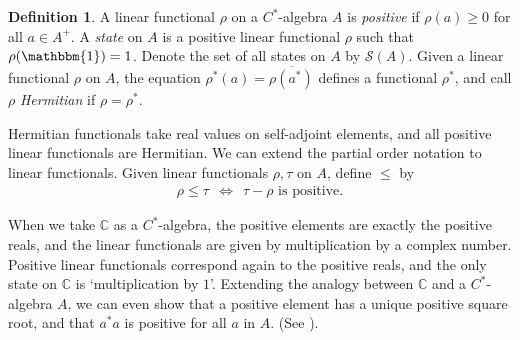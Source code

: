 \documentclass[11pt,a4paper]{report}
\theoremstyle{plain}
\theoremstyle{definition}
\newtheorem{defn}{Definition}
\newcommand{\1}{\mathbbm{1}}
\newcommand{\C}{\mathbb{C}}
\renewcommand{\S}{\mathscr{S}}
\renewcommand{\bar}{\overline}
\begin{document}
\begin{defn}
	A linear functional $\rho$ on a $C^\ast$-algebra $A$ is \emph{positive} if $\rho(a)\geq 0$ for all 
	$a\in A^+$. A \emph{state} on $A$ is a positive linear functional $\rho$ such that $\rho(\1)=1$. 
	Denote the set of all states on $A$ by $\S(A)$. 
	Given a linear functional $\rho$ on $A$, the equation $\rho^\ast(a) =\bar{\rho(a^\ast)}$ defines a 
	functional $\rho^\ast$, and call $\rho$ \emph{Hermitian} if $\rho=\rho^\ast$.
\end{defn}
Hermitian functionals take real values on self-adjoint elements, and all positive linear functionals are 
Hermitian.
We can extend the partial order notation to linear functionals. Given linear functionals $\rho,\tau$ on 
$A$, define $\leq$ by
\begin{align*}
	\rho \leq \tau ~~\iff~~ \tau - \rho \mbox{ is positive}.
\end{align*}

When we take $\C$ as a $C^\ast$-algebra, the positive elements are exactly the 
positive reals, and the linear functionals are given by multiplication by a 
complex number. Positive linear functionals correspond again to the positive 
reals, and the only state on $\C$ is `multiplication by $1$'.
Extending the analogy between $\C$ and a $C^\ast$-algebra $A$, we can even show 
that a positive element has a unique positive square root, and that $a^\ast a$ 
is positive for all $a$ in $A$. (See \cite[4.2.5 and 4.2.6]{kadison83}).
\end{document}
